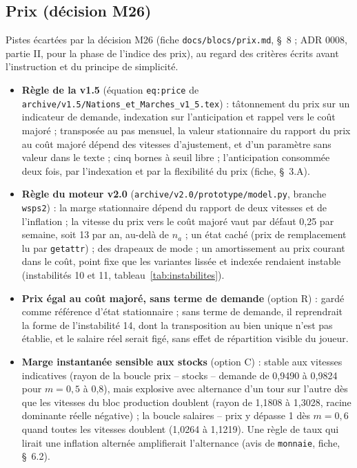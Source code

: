 \documentclass[11pt,a4paper]{article}
\begin{document}
\subsection*{Prix (décision M26)}
Pistes écartées par la décision M26 (fiche \nolinkurl{docs/blocs/prix.md}, \S~8 ; ADR 0008, partie II, pour la phase de l'indice des prix), au regard des critères écrits avant l'instruction et du principe de simplicité.
\begin{itemize}
\item \textbf{Règle de la v1.5} (équation \texttt{eq:price} de \nolinkurl{archive/v1.5/Nations_et_Marches_v1_5.tex}) : tâtonnement du prix sur un indicateur de demande, indexation sur l'anticipation et rappel vers le coût majoré ; transposée au pas mensuel, la valeur stationnaire du rapport du prix au coût majoré dépend des vitesses d'ajustement, et d'un paramètre sans valeur dans le texte ; cinq bornes à seuil libre ; l'anticipation consommée deux fois, par l'indexation et par la flexibilité du prix (fiche, \S~3.A).
\item \textbf{Règle du moteur v2.0} (\texttt{archive/v2.0/prototype/model.py}, branche \texttt{wsps2}) : la marge stationnaire dépend du rapport de deux vitesses et de l'inflation ; la vitesse du prix vers le coût majoré vaut par défaut 0,25 par semaine, soit 13 par an, au-delà de $n_a$ ; un état caché (prix de remplacement lu par \texttt{getattr}) ; des drapeaux de mode ; un amortissement au prix courant dans le coût, point fixe que les variantes lissée et indexée rendaient instable (instabilités 10 et 11, tableau~\ref{tab:instabilites}).
\item \textbf{Prix égal au coût majoré, sans terme de demande} (option R) : gardé comme référence d'état stationnaire ; sans terme de demande, il reprendrait la forme de l'instabilité 14, dont la transposition au bien unique n'est pas établie, et le salaire réel serait figé, sans effet de répartition visible du joueur.
\item \textbf{Marge instantanée sensible aux stocks} (option C) : stable aux vitesses indicatives (rayon de la boucle prix -- stocks -- demande de 0,9490 à 0,9824 pour $m = 0{,}5$ à 0,8), mais explosive avec alternance d'un tour sur l'autre dès que les vitesses du bloc production doublent (rayon de 1,1808 à 1,3028, racine dominante réelle négative) ; la boucle salaires -- prix y dépasse 1 dès $m = 0{,}6$ quand toutes les vitesses doublent (1,0264 à 1,1219). Une règle de taux qui lirait une inflation alternée amplifierait l'alternance (avis de \texttt{monnaie}, fiche, \S~6.2).

\end{itemize}
\end{document}

